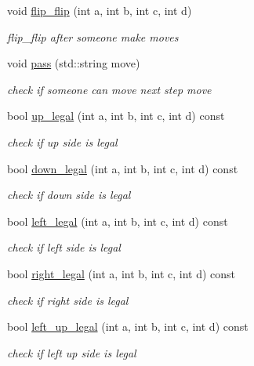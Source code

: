 \begin{DoxyCompactItemize}
void \hyperlink{classmain__savitch__14_1_1Othello_a49ca2e53baf37714c14c59875c270dc4}{flip\+\_\+flip} (int a, int b, int c, int d)
\begin{DoxyCompactList}\small\item\em flip\+\_\+flip after someone make moves \end{DoxyCompactList}\item 
void \hyperlink{classmain__savitch__14_1_1Othello_aa471c56d1634172f92acdfcbe3faa363}{pass} (std\+::string move)
\begin{DoxyCompactList}\small\item\em check if someone can move next step move \end{DoxyCompactList}\item 
bool \hyperlink{classmain__savitch__14_1_1Othello_a23310eaa078cddaf0fd86303f2f191f4}{up\+\_\+legal} (int a, int b, int c, int d) const 
\begin{DoxyCompactList}\small\item\em check if up side is legal \end{DoxyCompactList}\item 
bool \hyperlink{classmain__savitch__14_1_1Othello_a1a6041ee29e5586ec07bdfef782731d0}{down\+\_\+legal} (int a, int b, int c, int d) const 
\begin{DoxyCompactList}\small\item\em check if down side is legal \end{DoxyCompactList}\item 
bool \hyperlink{classmain__savitch__14_1_1Othello_a50e871a1c0ceb803f3ffc4d4b2987062}{left\+\_\+legal} (int a, int b, int c, int d) const 
\begin{DoxyCompactList}\small\item\em check if left side is legal \end{DoxyCompactList}\item 
bool \hyperlink{classmain__savitch__14_1_1Othello_ac094aa06f0df5ef57b03e249f892428e}{right\+\_\+legal} (int a, int b, int c, int d) const 
\begin{DoxyCompactList}\small\item\em check if right side is legal \end{DoxyCompactList}\item 
bool \hyperlink{classmain__savitch__14_1_1Othello_a8ec6b317a873a919836c4be0534427b9}{left\+\_\+up\+\_\+legal} (int a, int b, int c, int d) const 
\begin{DoxyCompactList}\small\item\em check if left up side is legal \end{DoxyCompactList}\item 

\end{DoxyCompactItemize}
